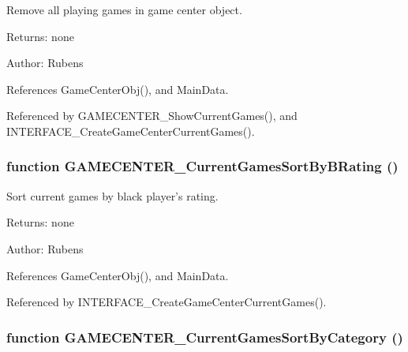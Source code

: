 Remove all playing games in game center object. 

\begin{Desc}
\item[Returns:]none \end{Desc}
\begin{Desc}
\item[Author:]Rubens \end{Desc}


References GameCenterObj(), and MainData.

Referenced by GAMECENTER\_\-ShowCurrentGames(), and INTERFACE\_\-CreateGameCenterCurrentGames().
\subsubsection[GAMECENTER\_\-CurrentGamesSortByBRating]{\setlength{\rightskip}{0pt plus 5cm}function GAMECENTER\_\-CurrentGamesSortByBRating ()}\label{gamecenter_2gamecenter_8js_77cf2aa57f19bc3985d0736f10fa1a01}


Sort current games by black player's rating. 

\begin{Desc}
\item[Returns:]none \end{Desc}
\begin{Desc}
\item[Author:]Rubens \end{Desc}


References GameCenterObj(), and MainData.

Referenced by INTERFACE\_\-CreateGameCenterCurrentGames().
\subsubsection[GAMECENTER\_\-CurrentGamesSortByCategory]{\setlength{\rightskip}{0pt plus 5cm}function GAMECENTER\_\-CurrentGamesSortByCategory ()}\label{gamecenter_2gamecenter_8js_84f39c321c95e0d38be97b412d900ebe}


